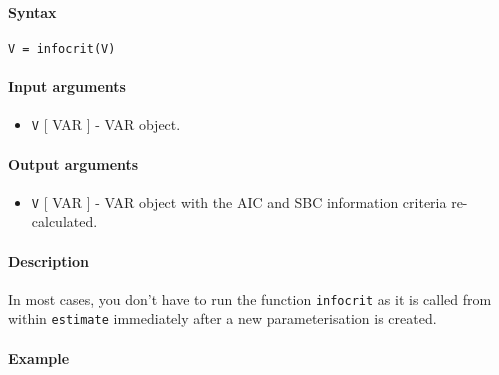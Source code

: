 


	\paragraph{Syntax}

\begin{verbatim}
V = infocrit(V)
\end{verbatim}

\paragraph{Input arguments}

\begin{itemize}
\itemsep1pt\parskip0pt
\item
  \texttt{V} {[} VAR {]} - VAR object.
\end{itemize}

\paragraph{Output arguments}

\begin{itemize}
\itemsep1pt\parskip0pt
\item
  \texttt{V} {[} VAR {]} - VAR object with the AIC and SBC information
  criteria re-calculated.
\end{itemize}

\paragraph{Description}

In most cases, you don't have to run the function \texttt{infocrit} as
it is called from within \texttt{estimate} immediately after a new
parameterisation is created.

\paragraph{Example}


